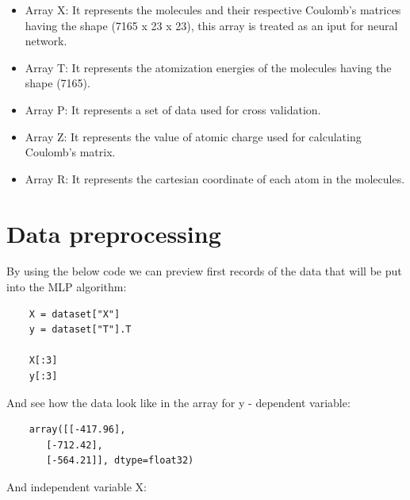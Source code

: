 \documentclass[a4paper,oneside,openright,11pt]{book}
\begin{document}
\begin{itemize}
    \item Array X: It represents the molecules and their respective Coulomb's matrices having the shape (7165 x 23 x 23), this array is treated as an iput for neural network.
    \item Array T: It represents the atomization energies of the molecules having the shape (7165).
    \item Array P: It represents a set of data used for cross validation.
    \item Array Z: It represents the value of atomic charge used for calculating Coulomb's matrix.
    \item Array R: It represents the cartesian coordinate of each atom in the molecules.
\end{itemize}

\section{Data preprocessing}

By using the below code we can preview first records of the data that will be put into the MLP algorithm:

\begin{verbatim}
    X = dataset["X"]
    y = dataset["T"].T

    X[:3]
    y[:3]
\end{verbatim}

And see how the data look like in the array for y - dependent variable:

\begin{verbatim}
    array([[-417.96],
       [-712.42],
       [-564.21]], dtype=float32)
\end{verbatim}

And independent variable X:
\end{document}
